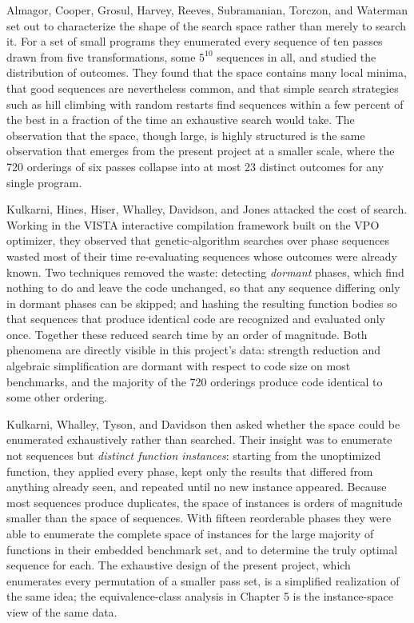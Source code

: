 Almagor, Cooper, Grosul, Harvey, Reeves, Subramanian, Torczon, and Waterman \cite{almagor2004} set out to characterize the shape of the search space rather than merely to search it. For a set of small programs they enumerated every sequence of ten passes drawn from five transformations, some $5^{10}$ sequences in all, and studied the distribution of outcomes. They found that the space contains many local minima, that good sequences are nevertheless common, and that simple search strategies such as hill climbing with random restarts find sequences within a few percent of the best in a fraction of the time an exhaustive search would take. The observation that the space, though large, is highly structured is the same observation that emerges from the present project at a smaller scale, where the 720 orderings of six passes collapse into at most 23 distinct outcomes for any single program.

Kulkarni, Hines, Hiser, Whalley, Davidson, and Jones \cite{kulkarni2004} attacked the cost of search. Working in the VISTA interactive compilation framework built on the VPO optimizer, they observed that genetic-algorithm searches over phase sequences wasted most of their time re-evaluating sequences whose outcomes were already known. Two techniques removed the waste: detecting \emph{dormant} phases, which find nothing to do and leave the code unchanged, so that any sequence differing only in dormant phases can be skipped; and hashing the resulting function bodies so that sequences that produce identical code are recognized and evaluated only once. Together these reduced search time by an order of magnitude. Both phenomena are directly visible in this project's data: strength reduction and algebraic simplification are dormant with respect to code size on most benchmarks, and the majority of the 720 orderings produce code identical to some other ordering.

Kulkarni, Whalley, Tyson, and Davidson \cite{kulkarni2006} then asked whether the space could be enumerated exhaustively rather than searched. Their insight was to enumerate not sequences but \emph{distinct function instances}: starting from the unoptimized function, they applied every phase, kept only the results that differed from anything already seen, and repeated until no new instance appeared. Because most sequences produce duplicates, the space of instances is orders of magnitude smaller than the space of sequences. With fifteen reorderable phases they were able to enumerate the complete space of instances for the large majority of functions in their embedded benchmark set, and to determine the truly optimal sequence for each. The exhaustive design of the present project, which enumerates every permutation of a smaller pass set, is a simplified realization of the same idea; the equivalence-class analysis in Chapter 5 is the instance-space view of the same data.

